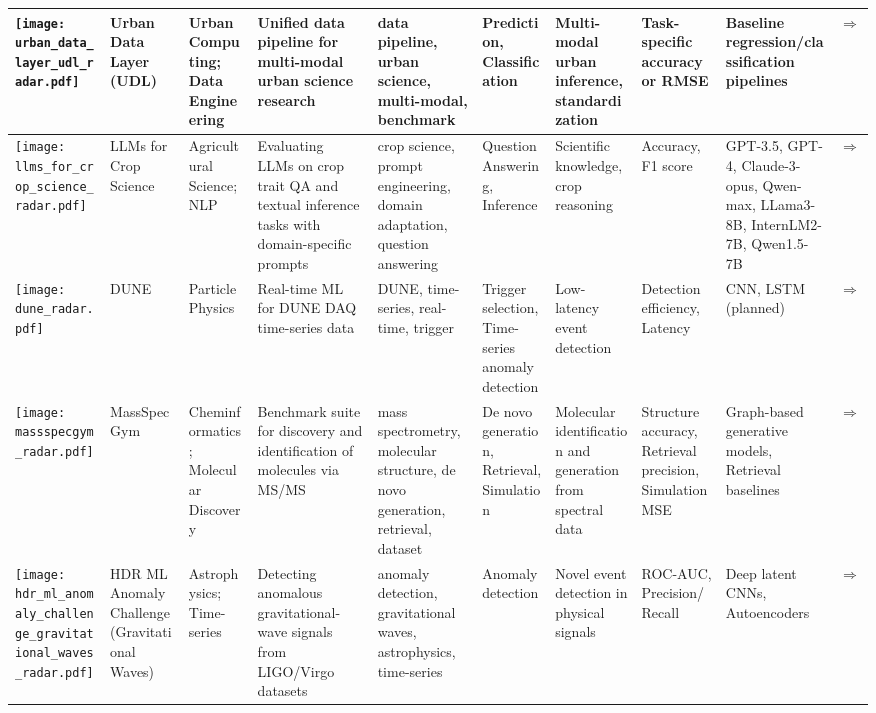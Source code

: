 \begin{landscape}
{\begin{longtable}{|p{}|p{}|p{}|p{}|p{}|p{}|p{}|p{}|p{}|p{}|}
\texttt{[image: urban\_data\_layer\_udl\_radar.pdf]} & Urban Data Layer (UDL) & Urban Computing; Data Engineering & Unified data pipeline for multi-modal urban science research & data pipeline, urban science, multi-modal, benchmark & Prediction, Classification & Multi-modal urban inference, standardization & Task-specific accuracy or RMSE & Baseline regression/classification pipelines & \cite{neurips2024_0db7f135}\href{https://neurips.cc/virtual/2024/poster/97837}{$\Rightarrow$} \\ \hline
\texttt{[image: llms\_for\_crop\_science\_radar.pdf]} & LLMs for Crop Science & Agricultural Science; NLP & Evaluating LLMs on crop trait QA and textual inference tasks with domain-specific prompts & crop science, prompt engineering, domain adaptation, question answering & Question Answering, Inference & Scientific knowledge, crop reasoning & Accuracy, F1 score & GPT-3.5, GPT-4, Claude-3-opus, Qwen-max, LLama3-8B, InternLM2-7B, Qwen1.5-7B & \cite{zhang2024empowering}\href{https://openreview.net/forum?id=hMj6jZ6JWU\#discussion}{$\Rightarrow$} \\ \hline
\texttt{[image: dune\_radar.pdf]} & DUNE & Particle Physics & Real-time ML for DUNE DAQ time-series data & DUNE, time-series, real-time, trigger & Trigger selection, Time-series anomaly detection & Low-latency event detection & Detection efficiency, Latency & CNN, LSTM (planned) & \cite{abud2021deep}\href{https://indico.fnal.gov/event/66520/contributions/301423/attachments/182439/250508/fast\_ml\_dunedaq\_sonic\_10\_15\_24.pdf}{$\Rightarrow$} \\ \hline
\texttt{[image: massspecgym\_radar.pdf]} & MassSpecGym & Cheminformatics; Molecular Discovery & Benchmark suite for discovery and identification of molecules via MS/MS & mass spectrometry, molecular structure, de novo generation, retrieval, dataset & De novo generation, Retrieval, Simulation & Molecular identification and generation from spectral data & Structure accuracy, Retrieval precision, Simulation MSE & Graph-based generative models, Retrieval baselines & \cite{neurips2024_c6c31413}\href{https://neurips.cc/virtual/2024/poster/97823}{$\Rightarrow$} \\ \hline
\texttt{[image: hdr\_ml\_anomaly\_challenge\_gravitational\_waves\_radar.pdf]} & HDR ML Anomaly Challenge (Gravitational Waves) & Astrophysics; Time-series & Detecting anomalous gravitational-wave signals from LIGO/Virgo datasets & anomaly detection, gravitational waves, astrophysics, time-series & Anomaly detection & Novel event detection in physical signals & ROC-AUC, Precision/Recall & Deep latent CNNs, Autoencoders & \cite{campolongo2025buildingmachinelearningchallenges}\href{https://www.codabench.org/competitions/2626/}{$\Rightarrow$} \\ \hline

\end{longtable}}
\end{landscape}
